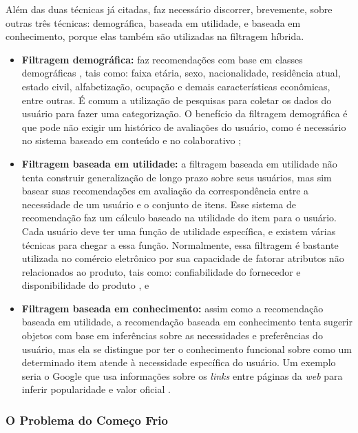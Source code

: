 Além das duas técnicas já citadas, faz necessário discorrer, brevemente, sobre outras três técnicas: demográfica, baseada em utilidade, 
e baseada em conhecimento, porque 
elas também são utilizadas na filtragem híbrida.

\begin{itemize}

    \item \textbf{Filtragem demográfica: }faz recomendações com base em classes demográficas \cite{burke2002}, tais 
	como: faixa etária, sexo, nacionalidade, residência atual, estado civil, 
	alfabetização, ocupação e demais características econômicas, entre outras. É comum a utilização de pesquisas para 
	coletar os  dados do usuário para fazer uma categorização. O benefício da filtragem demográfica é que
	pode não exigir um histórico de avaliações do usuário, como é necessário no sistema baseado em conteúdo e no colaborativo \cite{burke2002};
    \item \textbf{Filtragem baseada em utilidade: }a filtragem baseada em utilidade não tenta construir generalização de longo prazo sobre seus usuários, mas sim basear suas recomendações 
	em avaliação da correspondência entre a necessidade de um usuário e o conjunto de itens.
	Esse sistema de recomendação faz um cálculo baseado na utilidade do item para o usuário.
	Cada usuário deve ter uma função de utilidade específica, e existem várias técnicas para chegar a essa função. Normalmente, 
	essa filtragem é bastante utilizada no comércio eletrônico por sua capacidade de fatorar atributos não 
	relacionados ao produto, tais como:
	confiabilidade do fornecedor e disponibilidade do produto \cite{burke2002}, e
    \item \textbf{Filtragem baseada em conhecimento: }
	assim como a recomendação baseada em utilidade, a recomendação baseada em conhecimento tenta sugerir objetos com base em inferências
	sobre as necessidades e preferências do usuário, mas ela se distingue por ter o conhecimento funcional sobre 
	como um determinado item atende à necessidade específica do usuário. Um exemplo seria 
	o Google que usa informações sobre os \emph{links} entre páginas da \emph{web} para inferir popularidade e valor oficial \cite{burke2002}.
\end{itemize}

\subsubsection{O Problema do Começo Frio}

